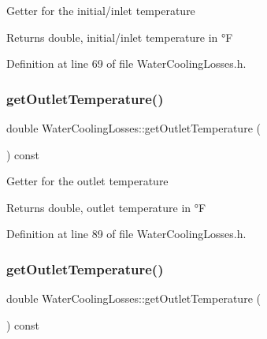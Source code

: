 Getter for the initial/inlet temperature

\begin{DoxyReturn}{Returns}
double, initial/inlet temperature in °F 
\end{DoxyReturn}


Definition at line 69 of file Water\+Cooling\+Losses.\+h.

\mbox{\label{class_water_cooling_losses_a79fb78755e813b2a3aa36ccd8ccebf7a}} 
\subsubsection{\texorpdfstring{get\+Outlet\+Temperature()}{getOutletTemperature()}\hspace{0.1cm}{\footnotesize\ttfamily [1/3]}}
{\footnotesize\ttfamily double Water\+Cooling\+Losses\+::get\+Outlet\+Temperature (\begin{DoxyParamCaption}{ }\end{DoxyParamCaption}) const\hspace{0.3cm}{\ttfamily [inline]}}

Getter for the outlet temperature

\begin{DoxyReturn}{Returns}
double, outlet temperature in °F 
\end{DoxyReturn}


Definition at line 89 of file Water\+Cooling\+Losses.\+h.

\mbox{\label{class_water_cooling_losses_a79fb78755e813b2a3aa36ccd8ccebf7a}} 
\subsubsection{\texorpdfstring{get\+Outlet\+Temperature()}{getOutletTemperature()}\hspace{0.1cm}{\footnotesize\ttfamily [2/3]}}
{\footnotesize\ttfamily double Water\+Cooling\+Losses\+::get\+Outlet\+Temperature (\begin{DoxyParamCaption}{ }\end{DoxyParamCaption}) const\hspace{0.3cm}{\ttfamily [inline]}}

